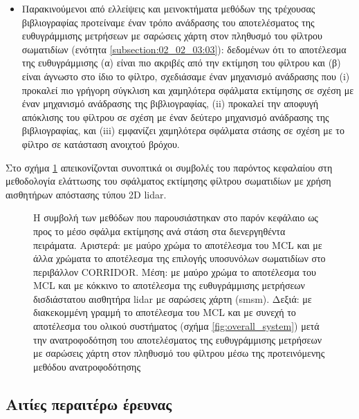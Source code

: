 \begin{itemize}
  \item Παρακινούμενοι από ελλείψεις και μεινοκτήματα μεθόδων της τρέχουσας
        βιβλιογραφίας προτείναμε έναν τρόπο ανάδρασης του αποτελέσματος της
        ευθυγράμμισης μετρήσεων με σαρώσεις χάρτη στον πληθυσμό του φίλτρου
        σωματιδίων (ενότητα \ref{subsection:02_02_03:03}): δεδομένων ότι το
        αποτέλεσμα της ευθυγράμμισης (α) είναι πιο ακριβές από την εκτίμηση του
        φίλτρου και (β) είναι άγνωστο στο ίδιο το φίλτρο, σχεδιάσαμε έναν
        μηχανισμό ανάδρασης που (i) προκαλεί πιο γρήγορη σύγκλιση και
        χαμηλότερα σφάλματα εκτίμησης σε σχέση με έναν μηχανισμό ανάδρασης της
        βιβλιογραφίας, (ii) προκαλεί την αποφυγή απόκλισης του φίλτρου σε σχέση
        με έναν δεύτερο μηχανισμό ανάδρασης της βιβλιογραφίας, και (iii)
        εμφανίζει χαμηλότερα σφάλματα στάσης σε σχέση με το φίλτρο σε κατάσταση
        ανοιχτού βρόχου.
\end{itemize}

Στο σχήμα \ref{fig:02_02_05:01} απεικονίζονται συνοπτικά οι συμβολές του
παρόντος κεφαλαίου στη μεθοδολογία ελάττωσης του σφάλματος εκτίμησης φίλτρου
σωματιδίων με χρήση αισθητήρων απόστασης τύπου 2D lidar.

\begin{figure}
  \hspace{-1.5cm}
  
  \vspace{1cm}
  \caption{\small Η συμβολή των μεθόδων που παρουσιάστηκαν στο παρόν κεφάλαιο
           ως προς το μέσο σφάλμα εκτίμησης ανά στάση στα διενεργηθέντα
           πειράματα. Αριστερά: με μαύρο χρώμα το αποτέλεσμα του MCL και με άλλα
           χρώματα το αποτέλεσμα της επιλογής υποσυνόλων σωματιδίων στο
           περιβάλλον CORRIDOR. Μέση: με μαύρο χρώμα το αποτέλεσμα του MCL και
           με κόκκινο το αποτέλεσμα της ευθυγράμμισης μετρήσεων δισδιάστατου
           αισθητήρα lidar με σαρώσεις χάρτη (smsm). Δεξιά: με διακεκομμένη
           γραμμή το αποτέλεσμα του MCL και με συνεχή το αποτέλεσμα του ολικού
           συστήματος (σχήμα \ref{fig:overall_system}) μετά την ανατροφοδότηση
           του αποτελέσματος της ευθυγράμμισης μετρήσεων με σαρώσεις χάρτη
           στον πληθυσμό του φίλτρου μέσω της προτεινόμενης μεθόδου
           ανατροφοδότησης}
  \label{fig:02_02_05:01}
\end{figure}


\subsection{Αιτίες περαιτέρω έρευνας}
\label{subsection:02_02_05:02}

